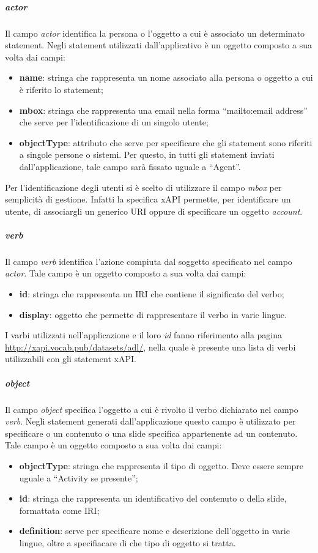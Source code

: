 \documentclass[../Tesi.tex]{subfiles}
\begin{document}
					\subparagraph{actor}
					Il campo \textit{actor} identifica la persona o l'oggetto a cui è associato un determinato statement. Negli statement utilizzati dall'applicativo è un oggetto composto a sua volta dai campi:
					\begin{itemize}
						\item \textbf{name}: stringa che rappresenta un nome associato alla persona o oggetto a cui è riferito lo statement;
						\item \textbf{mbox}: stringa che rappresenta una email nella forma ``mailto:email address'' che serve per l'identificazione di un singolo utente; 
						\item \textbf{objectType}: attributo che serve per specificare che gli statement sono riferiti a singole persone o sistemi. Per questo, in tutti gli statement inviati dall'applicazione, tale campo sarà fissato uguale a ``Agent''.
					\end{itemize}
					Per l'identificazione degli utenti si è scelto di utilizzare il campo \textit{mbox} per semplicità di gestione. Infatti la specifica xAPI permette, per identificare un utente, di associargli un generico URI oppure di specificare un oggetto \textit{account}.

					\subparagraph{verb}
					Il campo \textit{verb} identifica l'azione compiuta dal soggetto specificato nel campo \textit{actor}. Tale campo è un oggetto composto a sua volta dai campi:
					\begin{itemize}
						\item \textbf{id}: stringa che rappresenta un IRI che contiene il significato del verbo;
						\item \textbf{display}: oggetto che permette di rappresentare il verbo in varie lingue.
					\end{itemize}
					I varbi utilizzati nell'applicazione e il loro \textit{id} fanno riferimento alla pagina \url{http://xapi.vocab.pub/datasets/adl/}, nella quale è presente una lista di verbi utilizzabili con gli statement xAPI.

					\subparagraph{object}
					Il campo \textit{object} specifica l'oggetto a cui è rivolto il verbo dichiarato nel campo \textit{verb}. Negli statement generati dall'applicazione questo campo è utilizzato per specificare o un contenuto o una slide specifica appartenente ad un contenuto. Tale campo è un oggetto composto a sua volta dai campi:
					\begin{itemize}
						\item \textbf{objectType}: stringa che rappresenta il tipo di oggetto. Deve essere sempre uguale a ``Activity se presente'';
						\item \textbf{id}: stringa che rappresenta un identificativo del contenuto o della slide, formattata come IRI;
						\item \textbf{definition}: serve per specificare nome e descrizione dell'oggetto in varie lingue, oltre a specifiacare di che tipo di oggetto si tratta.
					\end{itemize}
\end{document}
